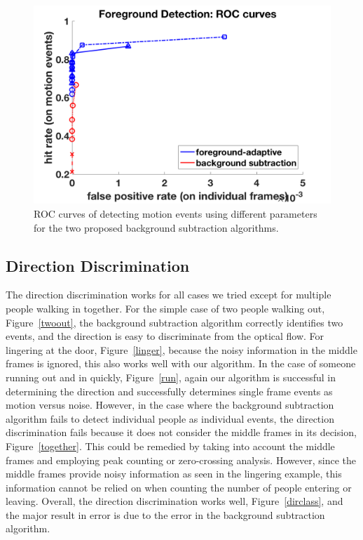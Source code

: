 \documentclass[12pt,oneside]{article} %
\begin{document}
\begin{figure}[htb]
\centering
\includegraphics[scale=0.52]{images/roc.png}
\caption{ROC curves of detecting motion events using different parameters for the two proposed
background subtraction algorithms.}
\label{roc}
\end{figure}

\subsection{Direction Discrimination}  %
The direction discrimination works for all cases we tried except for multiple people walking in together. For the simple case of two people walking out, Figure~\ref{twoout}, the background subtraction algorithm correctly identifies two events, and the direction is easy to discriminate from the optical flow. For lingering at the door, Figure~\ref{linger}, because the noisy information in the middle frames is ignored, this also works well with our algorithm. In the case of someone running out and in quickly, Figure~\ref{run}, again our algorithm is successful in determining the direction and successfully determines single frame events as motion versus noise. However, in the case where the background subtraction algorithm fails to detect individual people as individual events, the direction discrimination fails because it does not consider the middle frames in its decision, Figure~\ref{together}. This could be remedied by taking into account the middle frames and employing peak counting or zero-crossing analysis. However, since the middle frames provide noisy information as seen in the lingering example, this information cannot be relied on when counting the number of people entering or leaving. Overall, the direction discrimination works well, Figure~\ref{dirclass}, and the major result in error is due to the error in the background subtraction algorithm.
\end{document}
